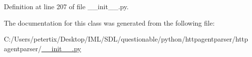 Definition at line 207 of file \+\_\+\+\_\+init\+\_\+\+\_\+.\+py.



The documentation for this class was generated from the following file\+:\begin{DoxyCompactItemize}
\item 
C\+:/\+Users/petertix/\+Desktop/\+I\+M\+L/\+S\+D\+L/questionable/python/httpagentparser/httpagentparser/\hyperlink{____init_____8py}{\+\_\+\+\_\+init\+\_\+\+\_\+.\+py}\end{DoxyCompactItemize}
